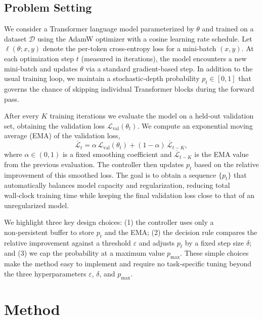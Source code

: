 \documentclass{article} %
\begin{document}
\subsection{Problem Setting}
\label{sec:problem}

We consider a Transformer language model parameterized by \(\theta\) and trained on a dataset \(\mathcal{D}\) using the AdamW optimizer \citep{loshchilov2017adamw} with a cosine learning rate schedule. 
Let \(\ell(\theta;x,y)\) denote the per-token cross-entropy loss for a mini-batch \((x,y)\). 
At each optimization step \(t\) (measured in iterations), the model encounters a new mini-batch and updates \(\theta\) via a standard gradient-based step. 
In addition to the usual training loop, we maintain a stochastic‑depth probability \(p_t\in[0,1]\) that governs the chance of skipping individual Transformer blocks during the forward pass.

After every \(K\) training iterations we evaluate the model on a held‑out validation set, obtaining the validation loss \(\mathcal{L}_{\text{val}}(\theta_t)\). 
We compute an exponential moving average (EMA) of the validation loss,
\[
\overline{\mathcal{L}}_t = \alpha\,\mathcal{L}_{\text{val}}(\theta_t) + (1-\alpha)\,\overline{\mathcal{L}}_{t-K},
\]
where \(\alpha\in(0,1)\) is a fixed smoothing coefficient and \(\overline{\mathcal{L}}_{t-K}\) is the EMA value from the previous evaluation. 
The controller then updates \(p_t\) based on the relative improvement of this smoothed loss. 
The goal is to obtain a sequence \(\{p_t\}\) that automatically balances model capacity and regularization, reducing total wall‑clock training time while keeping the final validation loss close to that of an unregularized model.

We highlight three key design choices: (1) the controller uses only a non‑persistent buffer to store \(p_t\) and the EMA; (2) the decision rule compares the relative improvement against a threshold \(\varepsilon\) and adjusts \(p_t\) by a fixed step size \(\delta\); and (3) we cap the probability at a maximum value \(p_{\text{max}}\). 
These simple choices make the method easy to implement and require no task‑specific tuning beyond the three hyperparameters \(\varepsilon\), \(\delta\), and \(p_{\text{max}}\).

\section{Method}
\label{sec:method}
\end{document}

